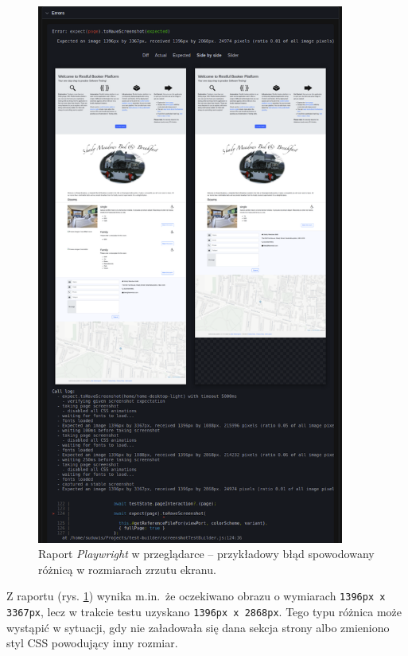 \documentclass[12pt]{report}
\begin{document}
\begin{figure}[H]
\centering
\includegraphics[width=0.90\textwidth]{e2e_report_web_test_log.png}
\caption{Raport \emph{Playwright} w przeglądarce – przykładowy błąd spowodowany różnicą w rozmiarach zrzutu ekranu.}
\label{fig:e2e-report-web-test-log}
\end{figure}

Z raportu (rys. \ref{fig:e2e-report-web-test-log}) wynika m.in.\ że oczekiwano obrazu o wymiarach \texttt{1396px x 3367px}, lecz w trakcie testu uzyskano \texttt{1396px x 2868px}. Tego typu różnica może wystąpić w sytuacji, gdy nie załadowała się dana sekcja strony albo zmieniono styl CSS powodujący inny rozmiar.
\end{document}
